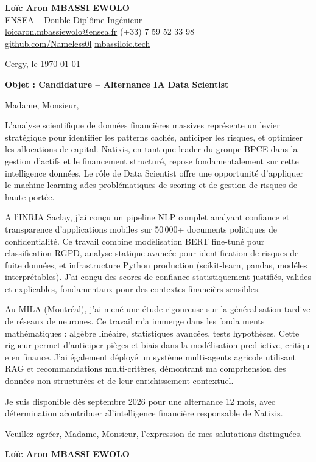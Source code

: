 \documentclass[a4paper,11pt]{article}
\begin{document}
\noindent
\textbf{Lo\"ic Aron MBASSI EWOLO} \\
ENSEA -- Double Dipl\^ome Ing\'enieur \\
\href{mailto:loicaron.mbassiewolo@ensea.fr}{loicaron.mbassiewolo@ensea.fr} \quad (+33) 7 59 52 33 98 \\
\href{https://github.com/Nameless0l}{github.com/Nameless0l} \quad \href{https://mbassiloic.tech}{mbassiloic.tech}

\vspace{1em}
\noindent Cergy, le \today

\vspace{1em}
\noindent \textbf{Objet : Candidature -- Alternance IA Data Scientist}

\vspace{1.5em}
\noindent Madame, Monsieur,

\vspace{0.8em}
\noindent L'analyse scientifique de donn\'ees financi\`eres massives repr\'esente un levier strat\'egique pour identifier les patterns cachés, anticiper les risques, et optimiser les allocations de capital. Natixis, en tant que leader du groupe BPCE dans la gestion d'actifs et le financement structur\'e, repose fondamentalement sur cette intelligence donn\'ees. Le r\^ole de Data Scientist offre une opportunit\'e d'appliquer le machine learning a\` des probl\'ematiques de scoring et de gestion de risques de haute port\'ee.

\vspace{0.8em}
\noindent A l'INRIA Saclay, j'ai con\c{c}u un pipeline NLP complet analyant confiance et transparence d'applications mobiles sur 50\,000+ documents politiques de confidentialit\'e. Ce travail combine mod\`elisation BERT fine-tun\'e pour classification RGPD, analyse statique avanc\'ee pour identification de risques de fuite donn\'ees, et infrastructure Python production (scikit-learn, pandas, modéles interprétables). J'ai con\c{c}u des scores de confiance statistiquement justifi\'es, valides et explicables, fondamentaux pour des contextes financi\`ers sensibles.

\vspace{0.8em}
\noindent Au MILA (Montr\'eal), j'ai men\'e une \'etude rigoureuse sur la g\'en\'eralisation tardive de r\'eseaux de neurones. Ce travail m'a immerge dans les fonda ments math\'ematiques : alg\`ebre lin\'eaire, statistiques avanc\'ees, tests hypoth\`eses. Cette rigueur permet d'anticiper pièges et biais dans la mod\'elisation pred ictive, critiqu e en finance. J'ai \'egalement d\'eploy\'e un syst\`eme multi-agents agricole utilisant RAG et recommandations multi-crit\`eres, d\'emontrant ma comprhension des donn\'ees non structur\'ees et de leur enrichissement contextuel.

\vspace{0.8em}
\noindent Je suis disponible d\`es septembre 2026 pour une alternance 12 mois, avec d\'etermination a\` contribuer a\` l'intelligence financi\`ere responsable de Natixis.

\vspace{1.5em}
\noindent Veuillez agr\'eer, Madame, Monsieur, l'expression de mes salutations distingu\'ees.

\vspace{2em}
\noindent \textbf{Lo\"ic Aron MBASSI EWOLO}
\end{document}
